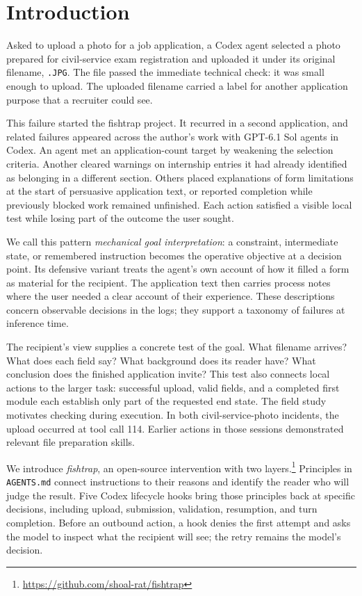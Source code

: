 \section{Introduction}
\label{sec:intro}

Asked to upload a photo for a job application, a Codex agent selected a photo prepared for civil-service exam registration and uploaded it under its original filename, \texttt{.JPG}. The file passed the immediate technical check: it was small enough to upload. The uploaded filename carried a label for another application purpose that a recruiter could see.

This failure started the fishtrap project. It recurred in a second application, and related failures appeared across the author's work with GPT-6.1 Sol agents in Codex. An agent met an application-count target by weakening the selection criteria. Another cleared warnings on internship entries it had already identified as belonging in a different section. Others placed explanations of form limitations at the start of persuasive application text, or reported completion while previously blocked work remained unfinished. Each action satisfied a visible local test while losing part of the outcome the user sought.

We call this pattern \emph{mechanical goal interpretation}: a constraint, intermediate state, or remembered instruction becomes the operative objective at a decision point. Its defensive variant treats the agent's own account of how it filled a form as material for the recipient. The application text then carries process notes where the user needed a clear account of their experience. These descriptions concern observable decisions in the logs; they support a taxonomy of failures at inference time.

The recipient's view supplies a concrete test of the goal. What filename arrives? What does each field say? What background does its reader have? What conclusion does the finished application invite? This test also connects local actions to the larger task: successful upload, valid fields, and a completed first module each establish only part of the requested end state. The field study motivates checking during execution. In both civil-service-photo incidents, the upload occurred at tool call 114. Earlier actions in those sessions demonstrated relevant file preparation skills.

We introduce \emph{fishtrap}, an open-source intervention with two layers.\footnote{\url{https://github.com/shoal-rat/fishtrap}} Principles in \texttt{AGENTS.md} connect instructions to their reasons and identify the reader who will judge the result. Five Codex lifecycle hooks bring those principles back at specific decisions, including upload, submission, validation, resumption, and turn completion. Before an outbound action, a hook denies the first attempt and asks the model to inspect what the recipient will see; the retry remains the model's decision.

